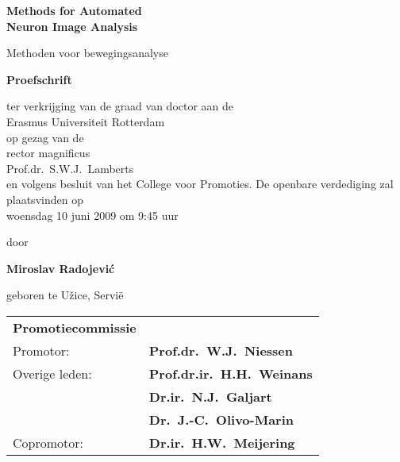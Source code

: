 %
%

\setlength{\parindent}{0pt}
\thispagestyle{empty}

\begin{center}
  
  \vspace*{5mm}
  {\huge\bf Methods for Automated\\[0.3ex] Neuron Image Analysis\\}

  \vfill
  \vfill
  \vfill

  {\large Methoden voor bewegingsanalyse\\[1ex]}


  \vfill
  \vfill
  \vfill
  \vfill

  {\large\bf Proefschrift}
  {\large 
  \vfill
  \vfill
  
  \normalsize
  
  ter verkrijging van de graad van doctor aan de \\Erasmus Universiteit Rotterdam\\
op gezag van de \\rector magnificus\\
  \vfill
Prof.dr.~S.W.J.~Lamberts\\
  \vfill
en
volgens besluit van het College voor Promoties. 
  \vfill
De openbare verdediging zal plaatsvinden op \\woensdag 10 juni 2009 om 9:45 uur
  
  
  \vfill
  \vfill
  
  \large
  door}

  \vfill
  \vfill
  \vfill

  {\large\bf Miroslav Radojevi\'{c}}

  \vfill

  {\large geboren te U\v{z}ice, Servi{\"e}}

  \vfill
  \vfill
\end{center}


\newpage
\thispagestyle{empty}
\label{othersideformal}

\begin{tabular}{@{}ll@{}}
\large\bf{Promotiecommissie} &\\ [8ex]
Promotor:    & {\bf Prof.dr.~W.J.~Niessen}\\[3ex]
Overige leden: & {\bf Prof.dr.ir.~H.H.~Weinans}\\[1ex]
&{\bf Dr.ir.~N.J.~Galjart}\\[1ex]
&{\bf Dr.~J.-C.~Olivo-Marin}\\[3ex]
Copromotor: & {\bf Dr.ir.~H.W.~Meijering}\\
\end{tabular}

